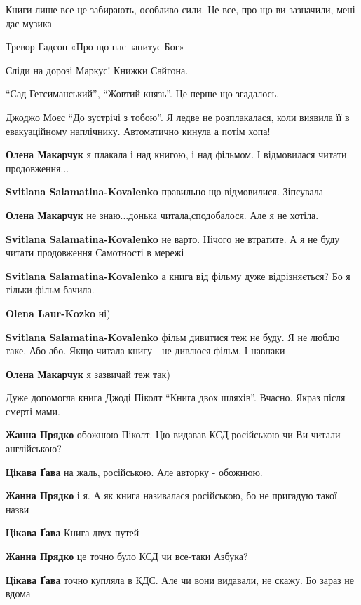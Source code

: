 
Книги лише все це забирають, особливо сили. Це все, про що ви зазначили, мені
дає музика


Тревор Гадсон «Про що нас запитує Бог»


Сліди на дорозі Маркус! Книжки Сайгона.


\enquote{Сад Гетсиманський}, \enquote{Жовтий князь}. Це перше що згадалось.


Джоджо Моєс \enquote{До зустрічі з тобою}. Я ледве не розплакалася, коли виявила її в
евакуаційному наплічнику. Автоматично кинула а потім хопа!

\begin{itemize} %
\textbf{Олена Макарчук} я плакала і над книгою, і над фільмом. І відмовилася читати продовження...

\textbf{Svitlana Salamatina-Kovalenko} правильно що відмовилися. Зіпсувала

\textbf{Олена Макарчук} не знаю...донька читала,сподобалося. Але я не хотіла.

\textbf{Svitlana Salamatina-Kovalenko} не варто. Нічого не втратите. А я не буду читати продовження Самотності в мережі

\textbf{Svitlana Salamatina-Kovalenko} а книга від фільму дуже відрізняється? Бо я тільки фільм бачила.

\textbf{Olena Laur-Kozko} ні)

\textbf{Svitlana Salamatina-Kovalenko} фільм дивитися теж не буду. Я не люблю таке. Або-або. Якщо читала книгу - не дивлюся фільм. І навпаки

\textbf{Олена Макарчук} я зазвичай теж так)
\end{itemize} %


Дуже допомогла книга Джоді Піколт \enquote{Книга двох шляхів}. Вчасно. Якраз
після смерті мами.

\begin{itemize} %
\textbf{Жанна Прядко} обожнюю Піколт. Цю видавав КСД російською чи Ви читали англійською?

\textbf{Цікава Ґава} на жаль, російською. Але авторку - обожнюю.

\textbf{Жанна Прядко} і я. А як книга називалася російською, бо не пригадую такої назви

\textbf{Цікава Ґава} Книга двух путей

\textbf{Жанна Прядко} це точно було КСД чи все-таки Азбука?

\textbf{Цікава Ґава} точно купляла в КДС. Але чи вони видавали, не скажу. Бо зараз не вдома
\end{itemize} %

